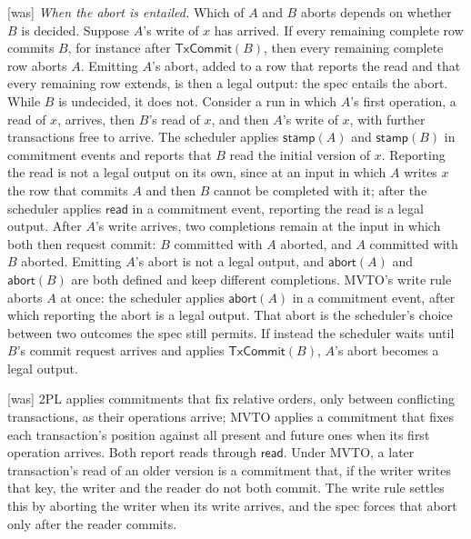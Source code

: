 \documentclass[sigconf]{cidr-2027}
\theoremstyle{remark}
\newcommand{\commitment}{commitment\xspace}
\newcommand{\commitments}{commitments\xspace}
\newcommand{\outrel}{extends\xspace}          %
\begin{document}
{\footnotesize\color{black!50}\noindent\textsf{[was]} \emph{When the abort is entailed.}  Which of $A$ and $B$ aborts depends on
whether $B$ is decided.  Suppose $A$'s write of $x$ has arrived.  If every
remaining complete row commits $B$, for instance after $\mathsf{TxCommit}(B)$,
then every remaining complete row aborts $A$.  Emitting $A$'s abort, added to a
row that reports the read and that every remaining row \outrel, is then
a legal output: the spec entails the abort.  While $B$ is undecided, it
does not.  Consider a run in which $A$'s first operation, a read of $x$,
arrives, then $B$'s read of $x$, and then $A$'s write of $x$, with further
transactions free to arrive.  The scheduler applies $\mathsf{stamp}(A)$ and
$\mathsf{stamp}(B)$ in \commitment events and reports that $B$ read the initial
version of $x$.  Reporting the read is not a legal output on its own, since at an
input in which $A$ writes $x$ the row that commits $A$ and then $B$ cannot be
completed with it; after the scheduler applies $\mathsf{read}$ in a
\commitment event, reporting the read is a legal output.  After $A$'s
write arrives, two completions remain at the input in which both then request
commit: $B$ committed with $A$ aborted, and $A$ committed with $B$ aborted.
Emitting $A$'s abort is not a legal output, and $\mathsf{abort}(A)$ and
$\mathsf{abort}(B)$ are both defined and keep different completions.  MVTO's
write rule aborts $A$ at once: the scheduler applies $\mathsf{abort}(A)$ in a
\commitment event, after which reporting the abort is a legal output.  That abort is the scheduler's choice between two
outcomes the spec still permits.  If instead the scheduler waits until
$B$'s commit request arrives and applies $\mathsf{TxCommit}(B)$, $A$'s abort
becomes a legal output.\par}



{\footnotesize\color{black!50}\noindent\textsf{[was]} 2PL applies \commitments that fix relative orders, only between conflicting
transactions, as their operations arrive; MVTO applies a \commitment that fixes each
transaction's position against all present and future ones when its first
operation arrives.  Both report reads through $\mathsf{read}$.  Under MVTO, a
later transaction's read of an older version is a \commitment that, if the
writer writes that key, the writer and the reader do not both commit.  The
write rule settles this by aborting the writer when its write arrives, and the
spec forces that abort only after the reader commits.\par}
\end{document}
